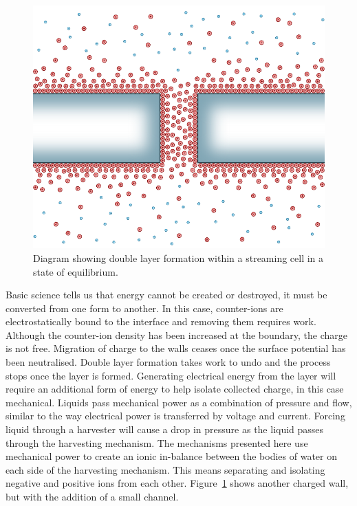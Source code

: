   \begin{figure}
      \centering
      \includegraphics{content/pt1/01-PowerHarvesting/graphics/intro_2_channel_relaxed}
      \caption{
        \label{fig:doubleLayerInChannel_noPressure}
        Diagram showing double layer formation within a streaming cell in a state of equilibrium.
      }
  \end{figure}
  Basic science tells us that energy cannot be created or destroyed, it must be converted from one form to another.
  In this case, counter-ions are electrostatically bound to the interface and removing them requires work.
  Although the counter-ion density has been increased at the boundary, the charge is not free.
  Migration of charge to the walls ceases once the surface potential has been neutralised.
  Double layer formation takes work to undo and the process stops once the layer is formed.
  Generating electrical energy from the layer will require an additional form of energy to help isolate collected charge, in this case mechanical.
  Liquids pass mechanical power as a combination of pressure and flow, similar to the way electrical power is transferred by voltage and current.
  Forcing liquid through a harvester will cause a drop in pressure as the liquid passes through the harvesting mechanism.
  The mechanisms presented here use mechanical power to create an ionic in-balance between the bodies of water on each side of the harvesting mechanism.
  This means separating and isolating negative and positive ions from each other.
  Figure~\ref{fig:doubleLayerInChannel_noPressure} shows another charged wall, but with the addition of a small channel.
